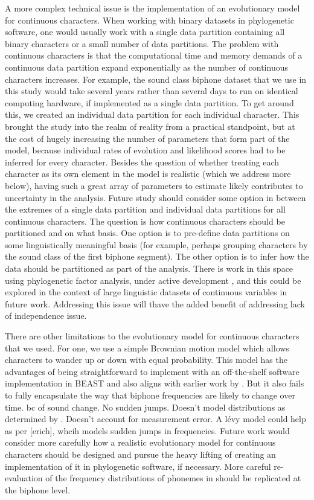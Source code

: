 \documentclass[]{article}
\begin{document}
A more complex technical issue is the implementation of an evolutionary model for continuous characters. When working with binary datasets in phylogenetic software, one would usually work with a single data partition containing all binary characters or a small number of data partitions. The problem with continuous characters is that the computational time and memory demands of a continuous data partition expand exponentially as the number of continuous characters increases. For example, the sound class biphone dataset that we use in this study would take several years rather than several days to run on identical computing hardware, if implemented as a single data partition. To get around this, we created an individual data partition for each individual character. This brought the study into the realm of reality from a practical standpoint, but at the cost of hugely increasing the number of parameters that form part of the model, because individual rates of evolution and likelihood scores had to be inferred for every character. Besides the question of whether treating each character as its own element in the model is realistic (which we address more below), having such a great array of parameters to estimate likely contributes to uncertainty in the analysis. Future study should consider some option in between the extremes of a single data partition and individual data partitions for all continuous characters. The question is how continuous characters should be partitioned and on what basis. One option is to pre-define data partitions on some linguistically meaningful basis (for example, perhaps grouping characters by the sound class of the first biphone segment). The other option is to infer how the data should be partitioned as part of the analysis. There is work in this space using phylogenetic factor analysis, under active development \autocites{tolkoff_phylogenetic_2018}{hassler_inferring_2020}, and this could be explored in the context of large linguistic datasets of continuous variables in future work. Addressing this issue will thave the added benefit of addressing lack of independence issue.

There are other limitations to the evolutionary model for continuous characters that we used. For one, we use a simple Brownian motion model which allows characters to wander up or down with equal probability. This model has the advantages of being straightforward to implement with an off-the-shelf software implementation in BEAST and also aligns with earlier work by \textcite{macklin-cordes_phylogenetic_2021}. But it also fails to fully encapsulate the way that biphone frequencies are likely to change over time. bc of sound change. No sudden jumps. Doesn't model distributions as determined by \textcite{macklin-cordes_re-evaluating_2020}. Doesn't account for measurement error. A lévy model could help as per {[}erich{]}, whcih models sudden jumps in frequencies. Future work would consider more carefully how a realistic evolutionary model for continuous characters should be designed and pursue the heavy lifting of creating an implementation of it in phylogenetic software, if necessary. More careful re-evaluation of the frequency distributions of phonemes in \textcite{macklin-cordes_re-evaluating_2020} should be replicated at the biphone level.
\end{document}
